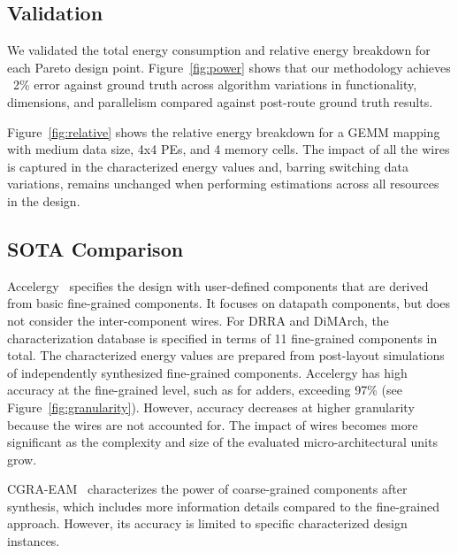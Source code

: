 % 
\subsection{Validation}
We validated the total energy consumption and relative energy breakdown for each Pareto design point. 
Figure~\ref{fig:power} shows that our methodology achieves ~2\% error against ground truth across algorithm variations in functionality, dimensions, and parallelism compared against post-route ground truth results.  


Figure~\ref{fig:relative} shows the relative energy breakdown for a GEMM mapping with medium data size, 4x4 PEs, and 4 memory cells. 
The impact of all the wires is captured in the characterized energy values and, barring switching data variations, remains unchanged when performing estimations across all resources in the design.



\subsection{SOTA Comparison}
Accelergy~\cite{wu2019accelergy} specifies the design with user-defined components that are derived from basic fine-grained components. 
It focuses on datapath components, but does not consider the inter-component wires. 
For DRRA and DiMArch, the characterization database is specified in terms of 11 fine-grained components in total. 
The characterized energy values are prepared from post-layout simulations of independently synthesized fine-grained components.
Accelergy has high accuracy at the fine-grained level, such as for adders, exceeding 97\% (see Figure~\ref{fig:granularity}). 
However, accuracy decreases at higher granularity because the wires are not accounted for.
The impact of wires becomes more significant as the complexity and size of the evaluated micro-architectural units grow. 

CGRA-EAM~\cite{wijtvliet2021cgra} characterizes the power of coarse-grained components after synthesis, which includes more information details compared to the fine-grained approach. 
However, its accuracy is limited to specific characterized design instances.

